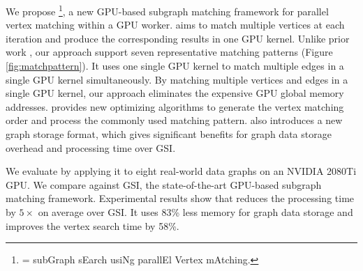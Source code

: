 We propose \SystemName\footnote{\SystemName = subGraph sEarch usiNg parallEl Vertex mAtching.}, a new GPU-based subgraph matching framework
for parallel vertex matching within a GPU worker. \SystemName aims to match multiple vertices at each iteration and produce the
corresponding results in one GPU kernel. Unlike prior work \cite{lai2015scalable}, our approach support seven representative matching
patterns (Figure \ref{fig:matchpattern}). It uses one single GPU kernel to match multiple edges in a single GPU kernel simultaneously. By
matching multiple vertices and edges in a single GPU kernel, our approach eliminates the expensive GPU global memory addresses. \SystemName
provides new optimizing algorithms to generate the vertex matching order and process the commonly used matching pattern. \SystemName also
introduces a new graph storage format, which gives significant benefits for graph data storage overhead and processing time over
GSI.

We evaluate \SystemName by applying it to eight real-world data graphs on an NVIDIA 2080Ti GPU. We compare \SystemName against GSI, the
state-of-the-art GPU-based subgraph matching framework. Experimental results show that \SystemName reduces the processing time by $5\times$
on average over GSI. It uses 83\% less memory for graph data storage and improves the vertex search time by 58\%.





